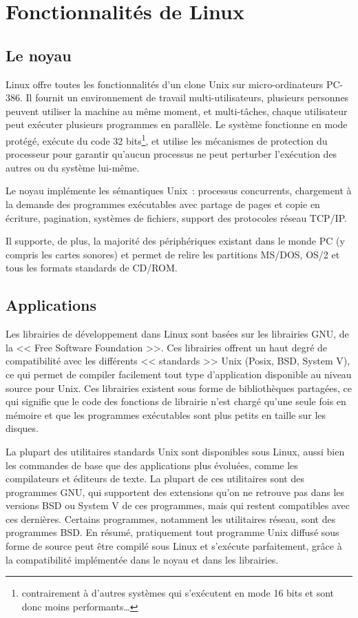 \documentclass[11pt,a4paper]{article}
\begin{document}
\section{Fonctionnalités de Linux}

\subsection{Le noyau}

	Linux offre toutes les fonctionnalités d'un clone Unix sur
micro-ordinateurs PC-386. Il fournit un
environnement de travail multi-utilisateurs, plusieurs personnes peuvent
utiliser la machine au même moment, et multi-tâches, chaque utilisateur peut
exécuter plusieurs programmes en parallèle. Le système fonctionne en mode
protégé, exécute du code 32 bits\footnote{contrairement à d'autres systèmes
qui s'exécutent en mode 16 bits et sont donc moins performants\ldots}, et
utilise les mécanismes de protection du processeur pour garantir qu'aucun
processus ne peut perturber l'exécution des autres ou du système lui-même.

	Le noyau implémente les sémantiques Unix~: processus concurrents,
chargement à la demande des
programmes exécutables avec partage de pages et copie en écriture,
pagination, systèmes de fichiers, support des protocoles réseau TCP/IP.

	Il supporte, de plus, la majorité des périphériques existant dans
le monde PC (y compris les cartes sonores) et permet de relire les partitions
MS/DOS, OS/2 et tous les formats standards de CD/ROM.

\subsection{Applications}

	Les librairies de développement dans Linux sont basées sur les
librairies GNU, de la << Free Software Foundation >>. Ces librairies offrent
un haut degré de compatibilité avec les différents << standards >> Unix (Posix,
BSD, System V), ce qui permet de compiler facilement tout type d'application
disponible au niveau source pour Unix. Ces librairies existent sous forme de
bibliothèques partagées, ce qui signifie que le code des fonctions de librairie
n'est chargé qu'une seule fois en mémoire et que les programmes exécutables
sont plus petits en taille sur les disques.

	La plupart des utilitaires standards Unix sont disponibles sous Linux,
aussi bien les commandes de base que des applications plus évoluées, comme
les compilateurs et éditeurs de texte. La plupart de ces utilitaires sont
des programmes GNU,
qui supportent des extensions qu'on ne retrouve pas dans les versions BSD
ou System V de ces programmes, mais qui restent compatibles avec ces
dernières. Certains programmes, notamment les utilitaires réseau, sont des
programmes BSD. En résumé, pratiquement tout programme Unix diffusé sous
forme de source peut être compilé sous Linux et s'exécute parfaitement, grâce
à la compatibilité implémentée dans le noyau et dans les librairies.
\end{document}
